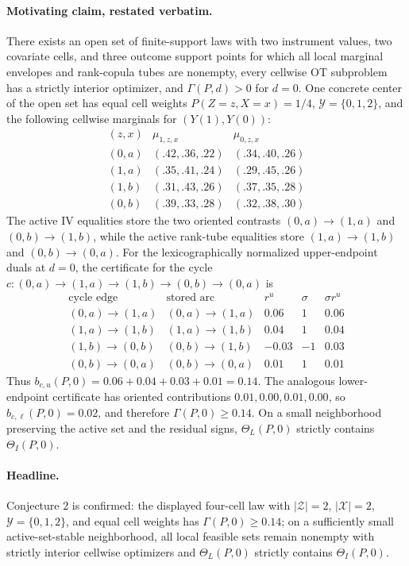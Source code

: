 \begin{theorem}\label{thm:witness}
\paragraph{Motivating claim, restated verbatim.}
There exists an open set of finite-support laws with two instrument values, two covariate cells, and three outcome support points for which all local marginal envelopes and rank-copula tubes are nonempty, every cellwise OT subproblem has a strictly interior optimizer, and \(\Gamma(P,d)>0\) for \(d=0\).  One concrete center of the open set has equal cell weights \(P(Z=z,X=x)=1/4\), \(\mathcal Y=\{0,1,2\}\), and the following cellwise marginals for \((Y(1),Y(0))\):
\[
\begin{array}{c|cc}
(z,x) & \mu_{1,z,x} & \mu_{0,z,x}\\ \hline
(0,a) & (.42,.36,.22) & (.34,.40,.26)\\
(1,a) & (.35,.41,.24) & (.29,.45,.26)\\
(1,b) & (.31,.43,.26) & (.37,.35,.28)\\
(0,b) & (.39,.33,.28) & (.32,.38,.30)
\end{array}
\]
The active IV equalities store the two oriented contrasts \((0,a)\to(1,a)\) and \((0,b)\to(1,b)\), while the active rank-tube equalities store \((1,a)\to(1,b)\) and \((0,b)\to(0,a)\).  For the lexicographically normalized upper-endpoint duals at \(d=0\), the certificate for the cycle \(c:(0,a)\to(1,a)\to(1,b)\to(0,b)\to(0,a)\) is
\[
\begin{array}{c|c|c|c|c}
\text{cycle edge} & \text{stored arc} & r^u & \sigma & \sigma r^u\\ \hline
(0,a)\to(1,a) & (0,a)\to(1,a) & 0.06 & 1 & 0.06\\
(1,a)\to(1,b) & (1,a)\to(1,b) & 0.04 & 1 & 0.04\\
(1,b)\to(0,b) & (0,b)\to(1,b) & -0.03 & -1 & 0.03\\
(0,b)\to(0,a) & (0,b)\to(0,a) & 0.01 & 1 & 0.01
\end{array}
\]
Thus \(b_{c,u}(P,0)=0.06+0.04+0.03+0.01=0.14\).  The analogous lower-endpoint certificate has oriented contributions \(0.01,0.00,0.01,0.00\), so \(b_{c,\ell}(P,0)=0.02\), and therefore \(\Gamma(P,0)\ge0.14\).  On a small neighborhood preserving the active set and the residual signs, \(\Theta_L(P,0)\) strictly contains \(\Theta_I(P,0)\).

\paragraph{Headline.}
Conjecture 2 is confirmed: the displayed four-cell law with \(|\mathcal Z|=2\), \(|\mathcal X|=2\), \(\mathcal Y=\{0,1,2\}\), and equal cell weights has \(\Gamma(P,0)\ge 0.14\); on a sufficiently small active-set-stable neighborhood, all local feasible sets remain nonempty with strictly interior cellwise optimizers and \(\Theta_L(P,0)\) strictly contains \(\Theta_I(P,0)\).
\end{theorem}

